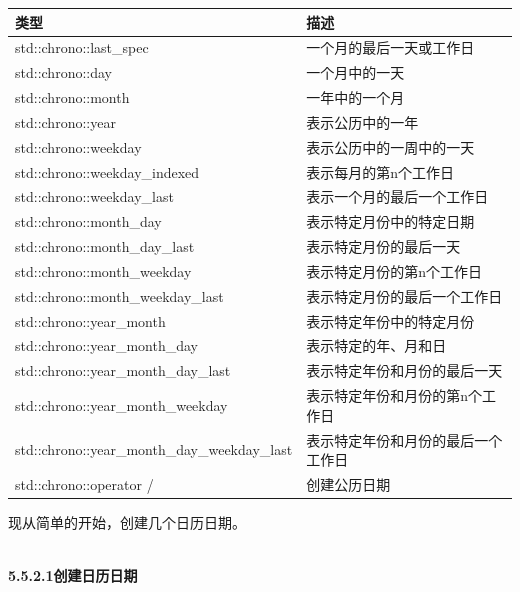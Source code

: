 \begin{table}[H]
\centering
\begin{tabular}{ll}
\textbf{类型}                 & \textbf{描述}                                   \\ \hline
std::chrono::last\_spec       & 一个月的最后一天或工作日           \\
std::chrono::day              & 一个月中的一天                            \\
std::chrono::month            & 一年中的一个月                           \\
std::chrono::year             & 表示公历中的一年            \\
std::chrono::weekday          & 表示公历中的一周中的一天 \\
std::chrono::weekday\_indexed & 表示每月的第n个工作日                 \\
std::chrono::weekday\_last    & 表示一个月的最后一个工作日                 \\
std::chrono::month\_day       & 表示特定月份中的特定日期          \\
std::chrono::month\_day\_last & 表示特定月份的最后一天            \\
std::chrono::month\_weekday   & 表示特定月份的第n个工作日        \\
std::chrono::month\_weekday\_last            & 表示特定月份的最后一个工作日           \\
std::chrono::year\_month      & 表示特定年份中的特定月份         \\
std::chrono::year\_month\_day & 表示特定的年、月和日             \\
std::chrono::year\_month\_day\_last          & 表示特定年份和月份的最后一天      \\
std::chrono::year\_month\_weekday            & 表示特定年份和月份的第n个工作日  \\
std::chrono::year\_month\_day\_weekday\_last & 表示特定年份和月份的最后一个工作日 \\
std::chrono::operator /       & 创建公历日期              
\end{tabular}
\end{table}

现从简单的开始，创建几个日历日期。

\hspace*{\fill} \\ %
\noindent
\textbf{5.5.2.1\hspace{0.2cm}创建日历日期}

